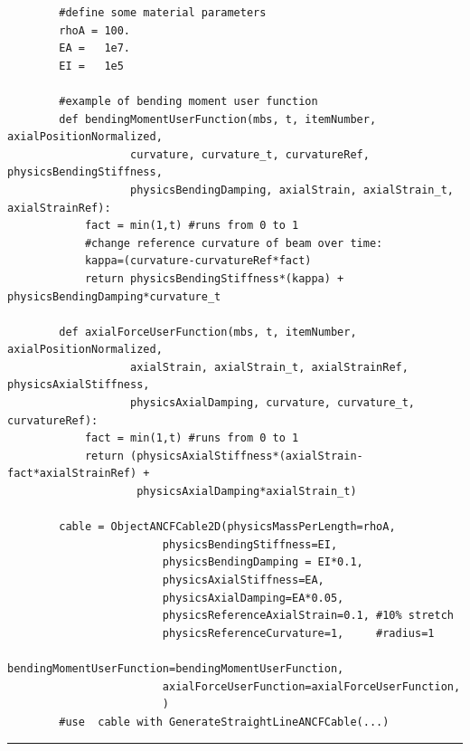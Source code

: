     \pythonstyle\begin{lstlisting}
        #define some material parameters
        rhoA = 100.
        EA =   1e7.
        EI =   1e5

        #example of bending moment user function
        def bendingMomentUserFunction(mbs, t, itemNumber, axialPositionNormalized, 
                   curvature, curvature_t, curvatureRef, physicsBendingStiffness, 
                   physicsBendingDamping, axialStrain, axialStrain_t, axialStrainRef):
            fact = min(1,t) #runs from 0 to 1
            #change reference curvature of beam over time:
            kappa=(curvature-curvatureRef*fact) 
            return physicsBendingStiffness*(kappa) + physicsBendingDamping*curvature_t

        def axialForceUserFunction(mbs, t, itemNumber, axialPositionNormalized, 
                   axialStrain, axialStrain_t, axialStrainRef, physicsAxialStiffness, 
                   physicsAxialDamping, curvature, curvature_t, curvatureRef):
            fact = min(1,t) #runs from 0 to 1
            return (physicsAxialStiffness*(axialStrain-fact*axialStrainRef) + 
                    physicsAxialDamping*axialStrain_t)

        cable = ObjectANCFCable2D(physicsMassPerLength=rhoA, 
                        physicsBendingStiffness=EI, 
                        physicsBendingDamping = EI*0.1,
                        physicsAxialStiffness=EA,
                        physicsAxialDamping=EA*0.05,
                        physicsReferenceAxialStrain=0.1, #10% stretch
                        physicsReferenceCurvature=1,     #radius=1
                        bendingMomentUserFunction=bendingMomentUserFunction,
                        axialForceUserFunction=axialForceUserFunction,
                        )
        #use  cable with GenerateStraightLineANCFCable(...)
    \end{lstlisting} \vspace{12pt}
\vspace{6pt}\par\noindent\rule{\textwidth}{0.4pt}
\label{miniExample_ObjectANCFCable2D}
\pythonstyle
